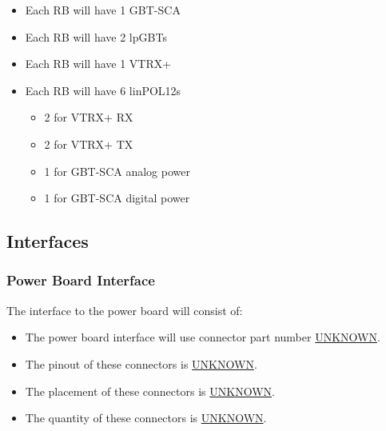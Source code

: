 \documentclass[11pt]{article}
\begin{document}
\begin{itemize}
\item Each RB will have 1 GBT-SCA
\item Each RB will have 2 lpGBTs
\item Each RB will have 1 VTRX+
\item Each RB will have 6 linPOL12s
\begin{itemize}
\item 2 for VTRX+ RX
\item 2 for VTRX+ TX
\item 1 for GBT-SCA analog power
\item 1 for GBT-SCA digital power
\end{itemize}
\end{itemize}
\subsection{Interfaces}
\label{sec:org0e4dbce}
\subsubsection{Power Board Interface}
\label{sec:orgd8a076d}
The interface to the power board will consist of:
\begin{itemize}
\item The power board interface will use connector part number \uline{UNKNOWN}.
\item The pinout of these connectors is \uline{UNKNOWN}.
\item The placement of these connectors is \uline{UNKNOWN}.
\item The quantity of these connectors is \uline{UNKNOWN}.
\end{itemize}
\end{document}
